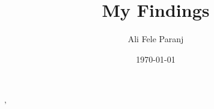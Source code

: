 '%
%
%
%	
%
\documentclass{labdiary}
\usepackage{commands}
\usepackage{natbib} 





\title{My Findings}
\author{Ali Fele Paranj}
\date{\today}


	
	\maketitle
	
	\tableofcontents
	
%	

	
	
	
	
	
	
	

	
	
	
	



%	
	


	

	
	


